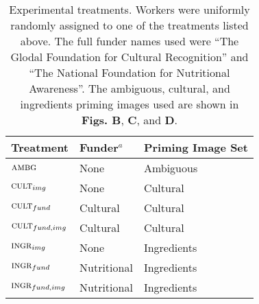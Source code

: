 \documentclass[a4paper]{report}
\begin{document}
\begin{table}[t]
\centering
	\begin{tabular}{ l  l  l }
		\hline                       
		Treatment & Funder$^a$ & Priming Image Set	\\ 
		\hline                       
		$\textsc{ambg}$ & None & Ambiguous\\
		$\textsc{cult}_{img}$ & None & Cultural\\
		$\textsc{cult}_{fund}$ & Cultural & Cultural\\
		$\textsc{cult}_{fund,img}$ & Cultural & Cultural\\
		$\textsc{ingr}_{img}$ & None & Ingredients\\
		$\textsc{ingr}_{fund}$ & Nutritional & Ingredients\\
		$\textsc{ingr}_{fund, img}$ & Nutritional & Ingredients\\
		\hline  
	\end{tabular}


	\caption{Experimental treatments.  Workers were uniformly randomly
		assigned to one of the treatments listed above.  The full funder 
		names used were ``The Glodal Foundation
		for Cultural Recognition'' and ``The National Foundation for 
		Nutritional Awareness''.  The ambiguous, cultural, and ingredients 
		priming images used are shown in \textbf{Figs. B}, \textbf{C}, and 
		\textbf{D}.}
	\label{table:1}
\end{table}
\end{document}
